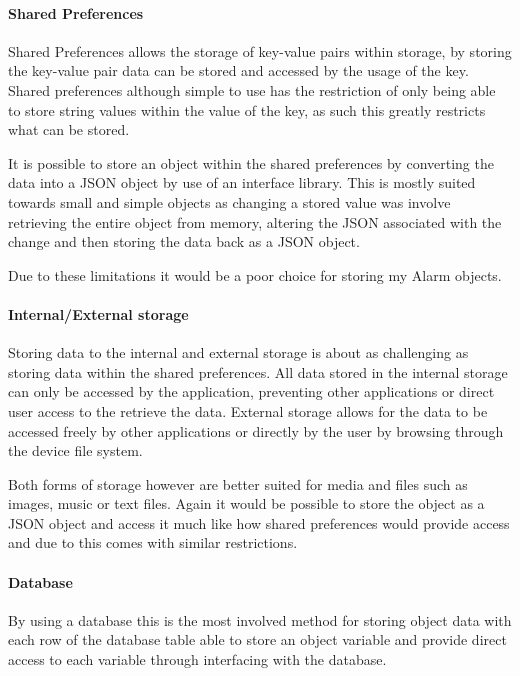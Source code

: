 \paragraph{Shared Preferences}\label{shared-preferences}

Shared Preferences allows the storage of key-value pairs within storage,
by storing the key-value pair data can be stored and accessed by the
usage of the key. Shared preferences although simple to use has the
restriction of only being able to store string values within the value
of the key, as such this greatly restricts what can be stored.

It is possible to store an object within the shared preferences by
converting the data into a JSON object by use of an interface library.
This is mostly suited towards small and simple objects as changing a
stored value was involve retrieving the entire object from memory,
altering the JSON associated with the change and then storing the data
back as a JSON object.

Due to these limitations it would be a poor choice for storing my Alarm
objects.

\paragraph{Internal/External storage}\label{internalexternal-storage}

Storing data to the internal and external storage is about as
challenging as storing data within the shared preferences. All data
stored in the internal storage can only be accessed by the application,
preventing other applications or direct user access to the retrieve the
data. External storage allows for the data to be accessed freely by
other applications or directly by the user by browsing through the
device file system.

Both forms of storage however are better suited for media and files such
as images, music or text files. Again it would be possible to store the
object as a JSON object and access it much like how shared preferences
would provide access and due to this comes with similar restrictions.

\paragraph{Database}\label{database}

By using a database this is the most involved method for storing object
data with each row of the database table able to store an object
variable and provide direct access to each variable through interfacing
with the database.

